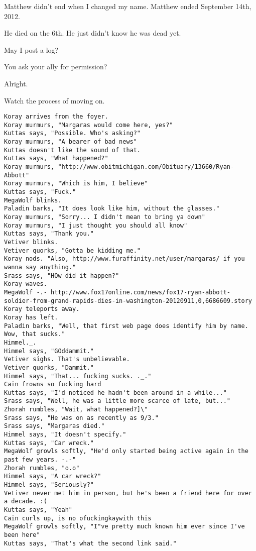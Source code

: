 \noindent Matthew didn't end when I changed my name. Matthew ended September 14th, 2012.

\begin{ally}
He died on the 6th. He just didn't know he was dead yet.
\end{ally}
May I post a log?

\begin{ally}
You ask your ally for permission?
\end{ally}
Alright.

Watch the process of moving on.
\newpage

\begin{verbatim}
Koray arrives from the foyer.
Koray murmurs, "Margaras would come here, yes?"
Kuttas says, "Possible. Who's asking?"
Koray murmurs, "A bearer of bad news"
Kuttas doesn't like the sound of that.
Kuttas says, "What happened?"
Koray murmurs, "http://www.obitmichigan.com/Obituary/13660/Ryan-Abbott"
Koray murmurs, "Which is him, I believe"
Kuttas says, "Fuck."
MegaWolf blinks.
Paladin barks, "It does look like him, without the glasses."
Koray murmurs, "Sorry... I didn't mean to bring ya down"
Koray murmurs, "I just thought you should all know"
Kuttas says, "Thank you."
Vetiver blinks.
Vetiver quorks, "Gotta be kidding me."
Koray nods. "Also, http://www.furaffinity.net/user/margaras/ if you wanna say anything."
Srass says, "HOw did it happen?"
Koray waves.
MegaWolf -.- http://www.fox17online.com/news/fox17-ryan-abbott-soldier-from-grand-rapids-dies-in-washington-20120911,0,6686609.story
Koray teleports away.
Koray has left.
Paladin barks, "Well, that first web page does identify him by name. Wow, that sucks."
Himmel._.
Himmel says, "GOddammit."
Vetiver sighs. That's unbelievable.
Vetiver quorks, "Dammit."
Himmel says, "That... fucking sucks. ._."
Cain frowns so fucking hard
Kuttas says, "I'd noticed he hadn't been around in a while..."
Srass says, "Well, he was a little more scarce of late, but..."
Zhorah rumbles, "Wait, what happened?]\"
Srass says, "He was on as recently as 9/3."
Srass says, "Margaras died."
Himmel says, "It doesn't specify."
Kuttas says, "Car wreck."
MegaWolf growls softly, "He'd only started being active again in the past few years. -.-"
Zhorah rumbles, "o.o"
Himmel says, "A car wreck?"
Himmel says, "Seriously?"
Vetiver never met him in person, but he's been a friend here for over a decade. :(
Kuttas says, "Yeah"
Cain curls up, is no ofuckingkaywith this
MegaWolf growls softly, "I"ve pretty much known him ever since I've been here"
Kuttas says, "That's what the second link said."

\end{verbatim}
